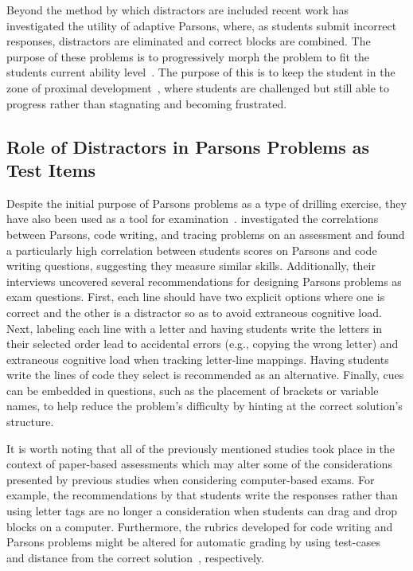 \documentclass[authorversion,nonacm]{acmart}
\begin{document}
Beyond the method by which distractors are included 
recent work has investigated the utility of adaptive Parsons, where, 
as students submit incorrect responses, distractors are eliminated and correct
blocks are combined. The purpose of these problems is to progressively morph
the problem to fit the students current ability
level~\cite{ericson2016dynamically, ericson2019investigating}. The purpose of
this is to keep the student in the zone of proximal
development~\cite{vygotsky1978mind}, where students are challenged but still
able to progress rather than stagnating and becoming frustrated. 

\subsection{Role of Distractors in Parsons Problems as Test Items}

Despite the initial purpose of Parsons problems as a type of drilling exercise,
they have also been used as a tool for examination~\cite{ lister2010naturally,
lopez2008relationships}.  \citet{denny2008evaluating} investigated the
correlations between Parsons, code writing, and tracing problems on an
assessment and found a particularly high correlation between students scores on
Parsons and code writing questions, suggesting they measure similar skills.
Additionally, their interviews uncovered several recommendations for designing
Parsons problems as exam questions.  First, each line should have two explicit
options where one is correct and the other is a distractor so as to avoid
extraneous cognitive load. Next, labeling each line with a letter and having
students write the letters in their selected order lead to accidental errors
(e.g., copying the wrong letter) and extraneous cognitive load  when tracking
letter-line mappings. Having students write the lines of code they select is
recommended as an alternative. Finally, cues can be embedded in questions, such
as the placement of brackets or variable names, to help reduce the problem's
difficulty by hinting at the correct solution's structure.  

It is worth noting that all of the previously mentioned studies took place
in the context of paper-based assessments which may alter some of the
considerations presented by previous studies when considering computer-based
exams. For example, the recommendations by \citet{denny2008evaluating} that
students write the responses rather than using letter tags are no longer a
consideration when students can drag and drop blocks on a computer.
Furthermore, the rubrics developed for code writing and Parsons problems might
be altered for automatic grading by using test-cases~\cite{
eddelbuettel2020r} and distance from the correct
solution~\cite{poulsen2022efficient}, respectively. 
\end{document}
